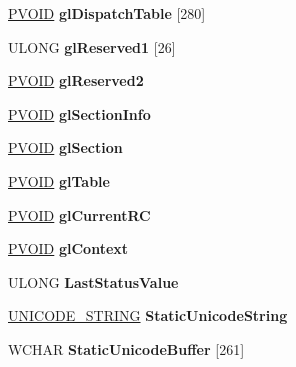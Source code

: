 \begin{DoxyCompactItemize}
\hyperlink{interfacevoid}{P\+V\+O\+ID} {\bfseries gl\+Dispatch\+Table} \mbox{[}280\mbox{]}
\item 
\mbox{\label{struct___t_e_b_a4f365ff3280061d756fabd46c5090a4a}} 
U\+L\+O\+NG {\bfseries gl\+Reserved1} \mbox{[}26\mbox{]}
\item 
\mbox{\label{struct___t_e_b_a7e1915c952acfca657c8c0bcb2e33371}} 
\hyperlink{interfacevoid}{P\+V\+O\+ID} {\bfseries gl\+Reserved2}
\item 
\mbox{\label{struct___t_e_b_a719178e489d18bf281a8d2ea7660a1ab}} 
\hyperlink{interfacevoid}{P\+V\+O\+ID} {\bfseries gl\+Section\+Info}
\item 
\mbox{\label{struct___t_e_b_a0de15752440854e3ace9f3f83f62513b}} 
\hyperlink{interfacevoid}{P\+V\+O\+ID} {\bfseries gl\+Section}
\item 
\mbox{\label{struct___t_e_b_a04f081624c59a687f18d7ffb0e357e87}} 
\hyperlink{interfacevoid}{P\+V\+O\+ID} {\bfseries gl\+Table}
\item 
\mbox{\label{struct___t_e_b_a20378aba0b755d28e972febb80ea1dff}} 
\hyperlink{interfacevoid}{P\+V\+O\+ID} {\bfseries gl\+Current\+RC}
\item 
\mbox{\label{struct___t_e_b_a20ae20678bc313a877af7b23710450bb}} 
\hyperlink{interfacevoid}{P\+V\+O\+ID} {\bfseries gl\+Context}
\item 
\mbox{\label{struct___t_e_b_aeea0818ba8245297dd04eafda717d66e}} 
U\+L\+O\+NG {\bfseries Last\+Status\+Value}
\item 
\mbox{\label{struct___t_e_b_a95f589c4c8340de440beb276051ebcba}} 
\hyperlink{struct___u_n_i_c_o_d_e___s_t_r_i_n_g}{U\+N\+I\+C\+O\+D\+E\+\_\+\+S\+T\+R\+I\+NG} {\bfseries Static\+Unicode\+String}
\item 
\mbox{\label{struct___t_e_b_a1cfd68a084868b45894e23e0c8067a3d}} 
W\+C\+H\+AR {\bfseries Static\+Unicode\+Buffer} \mbox{[}261\mbox{]}
\item 
\mbox{\label{struct___t_e_b_ae014527d63a75557bd4854e07a70810f}} 

\end{DoxyCompactItemize}
